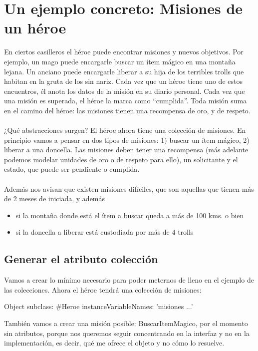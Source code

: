 \documentclass[a4paper,12pt]{book}
\begin{document}
\section{Un ejemplo concreto: Misiones de un héroe}
En ciertos casilleros el héroe puede encontrar misiones y nuevos objetivos. Por ejemplo, un mago puede
encargarle buscar un ítem mágico en una montaña lejana. Un anciano puede encargarle liberar a su hija de
los terribles trolls que habitan en la gruta de los sin nariz. Cada vez que un héroe tiene uno de estos
encuentros, él anota los datos de la misión en su diario personal. Cada vez que una misión es superada,
el héroe la marca como “cumplida”. Toda misión suma en el camino del héroe: las misiones tienen una
recompensa de oro, y de respeto.
\\
\\
¿Qué abstracciones surgen? El héroe ahora tiene una colección de misiones. En principio vamos a pensar en
dos tipos de misiones: 1) buscar un ítem mágico, 2) liberar a una doncella. Las misiones deben tener una
recompensa (más adelante podemos modelar unidades de oro o de respeto para ello), un solicitante y el estado,
que puede ser pendiente o cumplida. 
\\
\\
Además nos avisan que existen misiones difíciles, que son aquellas que tienen más de 2 meses de iniciada, 
y además
\begin{itemize}
 \item si la montaña donde está el ítem a buscar queda a más de 100 kms. o bien 
 \item si la doncella a liberar está custodiada por más de 4 trolls
\end{itemize}

\subsection{Generar el atributo colección}
Vamos a crear lo mínimo necesario para poder meternos de lleno en el ejemplo de las colecciones.
Ahora el héroe tendrá una colección de misiones:

\begin{code}
Object subclass: #Heroe
	instanceVariableNames: 'misiones ...'
\end{code}

También vamos a crear una misión posible: BuscarItemMagico, por el momento sin atributos, porque nos queremos
seguir concentrando en la interfaz y no en la implementación, es decir, qué me ofrece el objeto y no cómo lo
resuelve.
\end{document}
